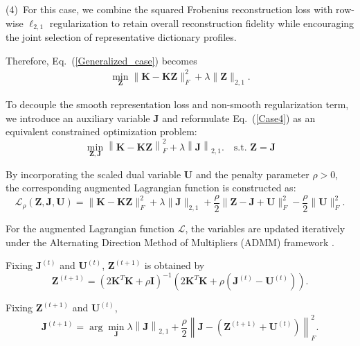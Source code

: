 \documentclass[ASNA,twocolumn]{USG} %
\begin{document}
(4)~For this case, we combine the squared Frobenius reconstruction loss with row-wise $\ell_{2,1}$ regularization to retain overall reconstruction fidelity while encouraging the joint selection of representative dictionary profiles.

Therefore, Eq.~(\ref{Generalized_case}) becomes 
\begin{eqnarray}\label{Case4}
	\min_{\boldsymbol{Z}}\|\boldsymbol{K}-\boldsymbol{K}\boldsymbol{Z}\|_{F}^2+\lambda\|\boldsymbol{Z}\|_{2,1}.
\end{eqnarray}

To decouple the smooth representation loss and non-smooth regularization term, we introduce an auxiliary variable $\boldsymbol{J}$ and reformulate Eq.~(\ref{Case4}) as an equivalent constrained optimization problem:
\begin{equation}
\min_{\boldsymbol{Z}, \boldsymbol{J}} \left\|\boldsymbol{K} - \boldsymbol{K} \boldsymbol{Z}\right\|_{F}^2 + \lambda \left\|\boldsymbol{J}\right\|_{2,1}. \quad \text{s.t. } \boldsymbol{Z} = \boldsymbol{J}
\end{equation}

By incorporating the scaled dual variable $\boldsymbol{U}$ and the penalty parameter $\rho > 0$, the corresponding augmented Lagrangian function is constructed as:
\begin{equation}\label{eq:v4_mid}
    \mathcal{L}_\rho(\boldsymbol{Z}, \boldsymbol{J}, \boldsymbol{U})=\|\boldsymbol{K}-\boldsymbol{K} \boldsymbol{Z}\|_F^2+\lambda\|\boldsymbol{J}\|_{2,1}+\frac{\rho}{2}\|\boldsymbol{Z}-\boldsymbol{J}+\boldsymbol{U}\|_F^2 -\frac{\rho}{2}\|\boldsymbol{U}\|_F^2.
\end{equation}

For the augmented Lagrangian function $\mathcal{L}$, the variables are updated iteratively under the Alternating Direction Method of Multipliers (ADMM) framework \cite{wei2012distributed}.

Fixing $\boldsymbol{J}^{(t)}$ and $\boldsymbol{U}^{(t)}$, $\boldsymbol{Z}^{(t+1)}$ is obtained by
\begin{equation}
\boldsymbol{Z}^{(t+1)} = \left( 2\boldsymbol{K}^T \boldsymbol{K} + \rho \boldsymbol{I} \right)^{-1} \left( 2\boldsymbol{K}^T \boldsymbol{K} + \rho(\boldsymbol{J}^{(t)} - \boldsymbol{U}^{(t)}) \right).
\end{equation}

Fixing $\boldsymbol{Z}^{(t+1)}$ and $\boldsymbol{U}^{(t)}$,
\begin{equation}
\boldsymbol{J}^{(t+1)} = \arg \min_{\boldsymbol{J}} \lambda \left\|\boldsymbol{J}\right\|_{2,1} + \frac{\rho}{2} \left\|\boldsymbol{J} - (\boldsymbol{Z}^{(t+1)} + \boldsymbol{U}^{(t)})\right\|_F^2.
\end{equation}
\end{document}
